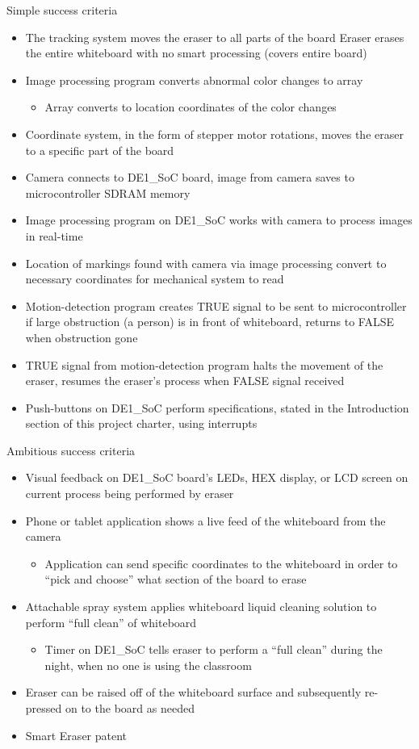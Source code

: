 Simple success criteria
\begin{itemize}
\item The tracking system moves the eraser to all parts of the board
Eraser erases the entire whiteboard with no smart processing (covers entire board)
\item Image processing program converts abnormal color changes to array
\begin{itemize}
\item Array converts to location coordinates of the color changes
\end{itemize}
\item Coordinate system, in the form of stepper motor rotations, moves the eraser to a specific part of the board
\item Camera connects to DE1\_SoC board, image from camera saves to microcontroller SDRAM memory
\item Image processing program on DE1\_SoC works with camera to process images in real-time
\item Location of markings found with camera via image processing convert to necessary coordinates for mechanical system to read
\item Motion-detection program creates TRUE signal to be sent to microcontroller if large obstruction (a person) is in front of whiteboard, returns to FALSE when obstruction gone
\item TRUE signal from motion-detection program halts the movement of the eraser, resumes the eraser's process when FALSE signal received
\item Push-buttons on DE1\_SoC perform specifications, stated in the Introduction section of this project charter, using interrupts \\
\end{itemize}

Ambitious success criteria
\begin{itemize}
\item Visual feedback on DE1\_SoC board's LEDs, HEX display, or LCD screen on current process being performed by eraser
\item Phone or tablet application shows a live feed of the whiteboard from the camera
\begin{itemize}
\item Application can send specific coordinates to the whiteboard in order to ``pick and choose'' what section of the board to erase
\end{itemize}
\item Attachable spray system applies whiteboard liquid cleaning solution to perform ``full clean'' of whiteboard
\begin{itemize}
\item Timer on DE1\_SoC tells eraser to perform a ``full clean'' during the night, when no one is using the classroom
\end{itemize}
\item Eraser can be raised off of the whiteboard surface and subsequently re-pressed on to the board as needed
\item Smart Eraser patent
\end{itemize}
 
